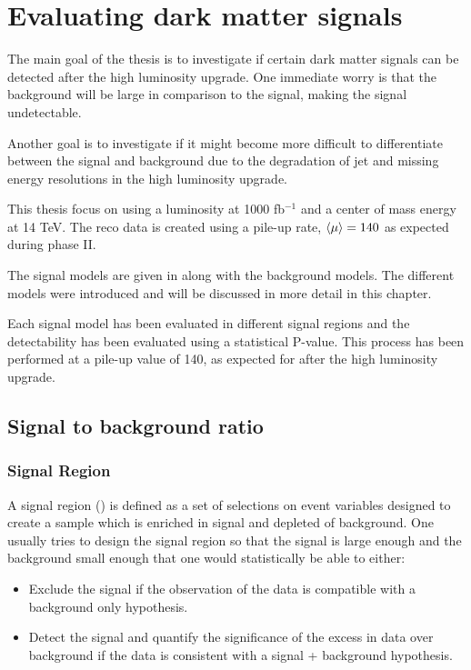 \chapter{Evaluating dark matter signals}

The main goal of the thesis is to investigate if certain dark matter signals can be detected after the high luminosity upgrade. One immediate worry is that the background will be large in comparison to the signal, making the signal undetectable.

Another goal is to investigate if it might become more difficult to differentiate between the signal and background due to the degradation of jet and missing energy resolutions in the high luminosity upgrade.

This thesis focus on using a luminosity at 1000 fb$^{-1}$ and a center of mass energy at 14 TeV. The reco data is created using a pile-up rate, $\left<\mu\right> = 140$ as expected during phase II.

The signal models are given in  along with the background models. The different models were introduced  and will be discussed in more detail in this chapter.

Each signal model has been evaluated in different signal regions and the detectability has been evaluated using a statistical P-value. This process has been performed at a pile-up value of 140, as expected for after the high luminosity upgrade. 

\newpage
\section{Signal to background ratio}
\subsection{Signal Region}
A signal region (\abbrSR) is defined as a set of selections on event variables designed to create a sample which is enriched in signal and depleted of background. One usually tries to design the signal region so that the signal is large enough and the background small enough that one would statistically be able to either:
\begin{itemize}
\item Exclude the signal if the observation of the data is compatible with a background only hypothesis.
\item Detect the signal and quantify the significance of the excess in data over background if the data is consistent with a signal + background hypothesis.
\end{itemize}

